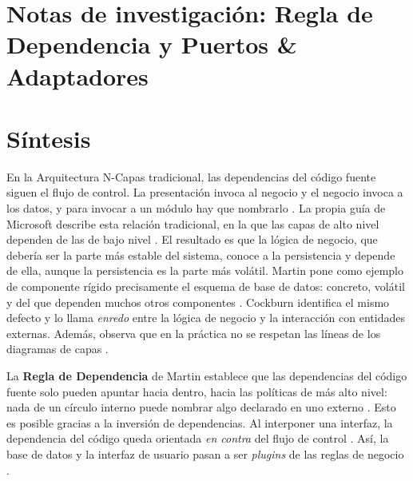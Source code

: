 
\section*{Notas de investigación: Regla de Dependencia y Puertos \& Adaptadores}

\section{Síntesis}

En la Arquitectura N-Capas tradicional, las dependencias del código fuente siguen el flujo de control. La presentación invoca al negocio y el negocio invoca a los datos, y para invocar a un módulo hay que nombrarlo \citep[pp.~44--45]{martin2017}. La propia guía de Microsoft describe esta relación tradicional, en la que las capas de alto nivel dependen de las de bajo nivel . El resultado es que la lógica de negocio, que debería ser la parte más estable del sistema, conoce a la persistencia y depende de ella, aunque la persistencia es la parte más volátil. Martin pone como ejemplo de componente rígido precisamente el esquema de base de datos: concreto, volátil y del que dependen muchos otros componentes . Cockburn identifica el mismo defecto y lo llama \emph{enredo} entre la lógica de negocio y la interacción con entidades externas. Además, observa que en la práctica no se respetan las líneas de los diagramas de capas \citep[«Nature of the Solution»]{cockburn2005}.

La \textbf{Regla de Dependencia} de Martin establece que las dependencias del código fuente solo pueden apuntar hacia dentro, hacia las políticas de más alto nivel: nada de un círculo interno puede nombrar algo declarado en uno externo . Esto es posible gracias a la inversión de dependencias. Al interponer una interfaz, la dependencia del código queda orientada \emph{en contra} del flujo de control \citep[pp.~45, 206]{martin2017}. Así, la base de datos y la interfaz de usuario pasan a ser \emph{plugins} de las reglas de negocio \citep[pp.~46, 170]{martin2017}.

